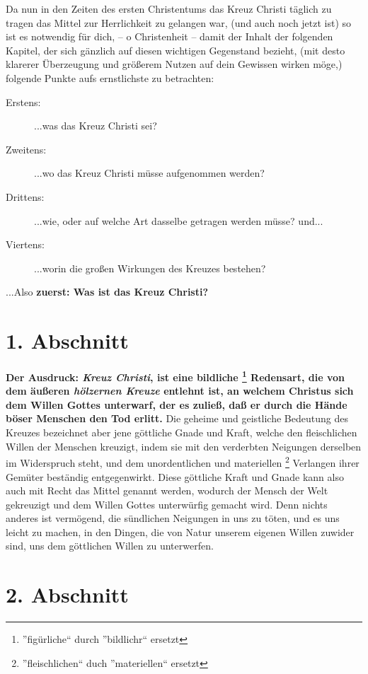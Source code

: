 Da nun in den Zeiten des ersten Christentums das Kreuz Christi täglich zu
tragen das Mittel zur Herrlichkeit zu gelangen war, (und auch noch jetzt ist)
so ist es notwendig für dich, -- o Christenheit -- damit der Inhalt der folgenden
Kapitel, der sich gänzlich auf diesen wichtigen Gegenstand bezieht, (mit desto
klarerer Überzeugung und größerem Nutzen auf dein Gewissen wirken möge,) 
folgende Punkte aufs ernstlichste zu betrachten:
\begin{description}
\item[Erstens:] ...was das Kreuz Christi sei?
\item[Zweitens:] ...wo das Kreuz Christi müsse aufgenommen werden?
\item[Drittens:] ...wie, oder auf welche Art dasselbe getragen werden müsse? und...
\item[Viertens:] ...worin die großen Wirkungen des Kreuzes bestehen?
\end{description}

...Also \textbf{zuerst: Was ist das Kreuz Christi?}

\section{1. Abschnitt} \label{kap3_ab1} 
\textbf{Der Ausdruck: \textit{Kreuz Christi}, ist eine bildliche \footnote{
''figürliche`` durch ''bildlichr`` ersetzt} Redensart, die von dem äußeren
\textit{hölzernen Kreuze} entlehnt ist, an welchem
 Christus sich dem Willen Gottes
unterwarf, der es zuließ, daß er durch die Hände böser Menschen den Tod erlitt.}
Die geheime und geistliche Bedeutung des Kreuzes bezeichnet aber jene göttliche
Gnade und Kraft, welche den fleischlichen Willen der Menschen kreuzigt, indem
sie mit den verderbten Neigungen derselben im Widerspruch steht, und dem
unordentlichen und materiellen \footnote{''fleischlichen`` duch ''materiellen`` 
ersetzt} Verlangen ihrer Gemüter beständig
entgegenwirkt. Diese göttliche Kraft und Gnade kann also auch mit Recht das
Mittel genannt werden, wodurch der Mensch der Welt gekreuzigt und dem Willen
Gottes unterwürfig gemacht wird. Denn nichts anderes ist vermögend, die
sündlichen Neigungen in uns zu töten, und es uns leicht zu machen, in den
Dingen, die von Natur unserem eigenen Willen zuwider sind, uns dem göttlichen
Willen zu unterwerfen.

\section{2. Abschnitt} \label{kap3_ab2} 

